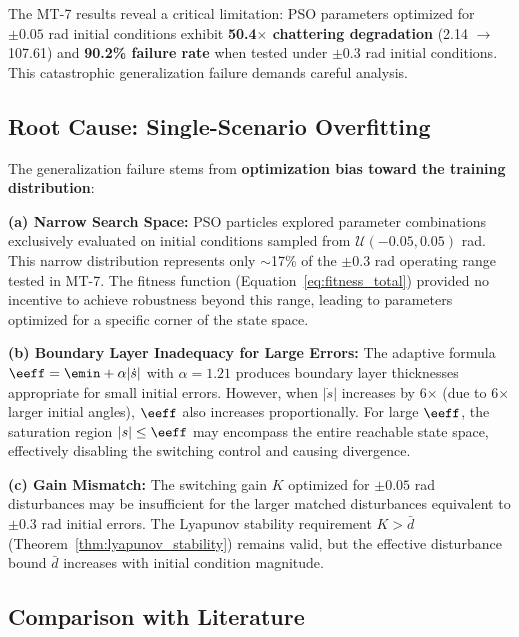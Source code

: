The MT-7 results reveal a critical limitation: PSO parameters optimized for $\pm 0.05$ rad initial conditions exhibit \textbf{50.4$\times$ chattering degradation} (2.14 $\to$ 107.61) and \textbf{90.2\% failure rate} when tested under $\pm 0.3$ rad initial conditions. This catastrophic generalization failure demands careful analysis.

\subsection{Root Cause: Single-Scenario Overfitting}
\label{subsec:overfitting_analysis}

The generalization failure stems from \textbf{optimization bias toward the training distribution}:

\textbf{(a) Narrow Search Space:}
PSO particles explored parameter combinations exclusively evaluated on initial conditions sampled from $\mathcal{U}(-0.05, 0.05)$ rad. This narrow distribution represents only $\sim$17\% of the $\pm 0.3$ rad operating range tested in MT-7. The fitness function (Equation~\ref{eq:fitness_total}) provided no incentive to achieve robustness beyond this range, leading to parameters optimized for a specific corner of the state space.

\textbf{(b) Boundary Layer Inadequacy for Large Errors:}
The adaptive formula $\eeff = \emin + \alpha|\dot{s}|$ with $\alpha = 1.21$ produces boundary layer thicknesses appropriate for small initial errors. However, when $|\dot{s}|$ increases by 6$\times$ (due to 6$\times$ larger initial angles), $\eeff$ also increases proportionally. For large $\eeff$, the saturation region $|s| \leq \eeff$ may encompass the entire reachable state space, effectively disabling the switching control and causing divergence.

\textbf{(c) Gain Mismatch:}
The switching gain $K$ optimized for $\pm 0.05$ rad disturbances may be insufficient for the larger matched disturbances equivalent to $\pm 0.3$ rad initial errors. The Lyapunov stability requirement $K > \bar{d}$ (Theorem~\ref{thm:lyapunov_stability}) remains valid, but the effective disturbance bound $\bar{d}$ increases with initial condition magnitude.

\subsection{Comparison with Literature}
\label{subsec:generalization_literature}

